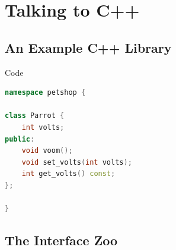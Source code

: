 \documentclass{beamer}
\begin{document}
\section{Talking to C++}

\subsection{An Example C++ Library}

\begin{frame}[fragile=singleslide]{Code}
\begin{lstlisting}[language=c++]
namespace petshop {

class Parrot {
    int volts;
public:
    void voom();
    void set_volts(int volts);
    int get_volts() const;
};

}
\end{lstlisting}
\end{frame}

\subsection{The Interface Zoo}
\end{document}
